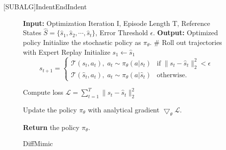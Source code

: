 [SUBALG]{Indent}{EndIndent}{}{\algorithmicend\ }%
\begin{wrapfigure}[18]{r}{0.55\textwidth}
\vspace{-23pt}
\begin{minipage}{0.55\textwidth}
\begin{algorithm}[H]
\small
    \caption{DiffMimic}
    \begin{algorithmic}[1]
        \State \textbf{Input:} Optimization Iteration I, Episode Length T, Reference States $\hat{S}=\{\hat{s}_1, \hat{s}_2, \cdots, \hat{s}_t\}$, Error Threshold $\epsilon$.
        \State \textbf{Output:} Optimized policy
        \State Initialize the stochastic policy as \(\pi_\theta\).
        \State \# Roll out trajectories with Expert Replay
        \State Initialize $s_1 \leftarrow \hat{s}_1$
            \begin{equation*}
              s_{t+1} =
                \begin{cases}
                  \mathcal{T}(s_{t}, a_t), \; a_t \sim \pi_{\theta}(a|s_{t}) & \text{if} \; \|s_t-\hat{s}_t\|_2^2 < \epsilon \\
                  \mathcal{T}(\hat{s}_{t}, a_t), \; a_t \sim \pi_{\theta}(a|\hat{s}_{t}) & \text{otherwise.}
                \end{cases}       
            \end{equation*}       
        \EndFor
  
        \State Compute loss
           $ \mathcal{L} =  \sum_{t=1}^T 
            \| s_t - \hat{s}_t \|_2^2$
        
        \State Update the policy \(\pi_\theta\) with analytical gradient \(\bigtriangledown_\theta \mathcal{L}\).

        
        \EndFor
        \State \textbf{Return} the policy \(\pi_\theta\).
\end{algorithmic}
\label{alg:DIL}
\end{algorithm}
\end{minipage}
\end{wrapfigure}